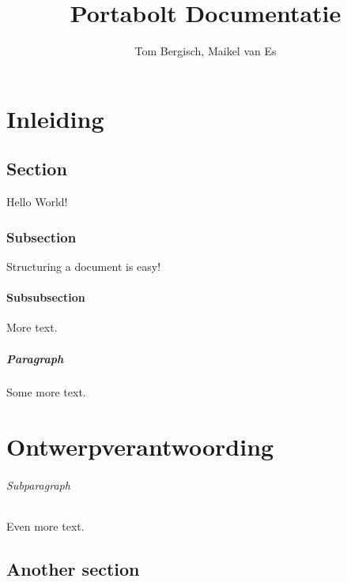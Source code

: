 \documentclass{report}
\title{Portabolt Documentatie}
\author{Tom Bergisch, Maikel van Es}
\begin{document}
  \maketitle
  \newpage 

	\maketitle
	
	\tableofcontents
	
	\chapter{Inleiding}
		\paragraph{}

	 	\paragraph{}
		


	
	
	\section{Section}
	Hello World!
	\subsection{Subsection}
	Structuring a document is easy!
	\subsubsection{Subsubsection}
	More text.
	\paragraph{Paragraph}
	Some more text.
	\chapter{Ontwerpverantwoording}
	\subparagraph{Subparagraph}
	Even more text.
	\section{Another section}


\begin{abstract}
\end{abstract}
\end{document}

